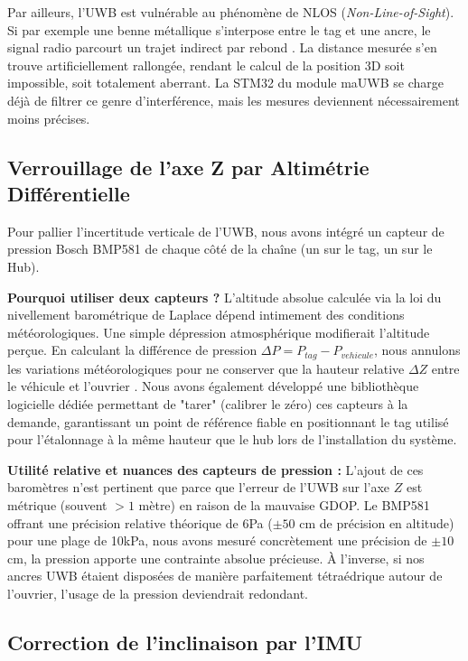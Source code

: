 Par ailleurs, l'UWB est vulnérable au phénomène de NLOS (\textit{Non-Line-of-Sight}). Si par exemple une benne métallique s'interpose entre le tag et une ancre, le signal radio parcourt un trajet indirect par rebond \cite{Zhao_2022}. La distance mesurée s'en trouve artificiellement rallongée, rendant le calcul de la position 3D soit impossible, soit totalement aberrant.
La STM32 du module maUWB se charge déjà de filtrer ce genre d'interférence, mais les mesures deviennent nécessairement moins précises.

\subsection{Verrouillage de l'axe Z par Altimétrie Différentielle}

Pour pallier l'incertitude verticale de l'UWB, nous avons intégré un capteur de pression Bosch BMP581 de chaque côté de la chaîne (un sur le tag, un sur le Hub). 

\textbf{Pourquoi utiliser deux capteurs ?}
L'altitude absolue calculée via la loi du nivellement barométrique de Laplace dépend intimement des conditions météorologiques. Une simple dépression atmosphérique modifierait l'altitude perçue. En calculant la différence de pression $\Delta P = P_{tag} - P_{vehicule}$, nous annulons les variations météorologiques pour ne conserver que la hauteur relative $\Delta Z$ entre le véhicule et l'ouvrier \cite{Sabatini_2014}. Nous avons également développé une bibliothèque logicielle dédiée permettant de "tarer" (calibrer le zéro) ces capteurs à la demande, garantissant un point de référence fiable en positionnant le tag utilisé pour l'étalonnage à la même hauteur que le hub lors de l'installation du système.

\textbf{Utilité relative et nuances des capteurs de pression :}
L'ajout de ces baromètres n'est pertinent que parce que l'erreur de l'UWB sur l'axe $Z$ est métrique (souvent $> 1$ mètre) en raison de la mauvaise GDOP. Le BMP581 offrant une précision relative théorique de 6Pa ($\pm 50$ cm de précision en altitude) pour une plage de 10kPa, nous avons mesuré concrètement une précision de $\pm 10$ cm, la pression apporte une contrainte absolue précieuse. À l'inverse, si nos ancres UWB étaient disposées de manière parfaitement tétraédrique autour de l'ouvrier, l'usage de la pression deviendrait redondant. 

\subsection{Correction de l'inclinaison par l'IMU}

